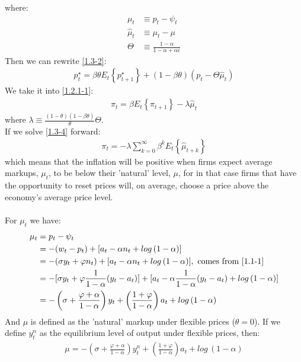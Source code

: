 \documentclass{article}
\numberwithin{equation}{section}
\begin{document}
where:
	\begin{align*}
		\mu_t &\equiv p_t - \psi_t\\
		\hat{\mu}_t &\equiv \mu_t - \mu\\
		\Theta &\equiv \frac{1 - \alpha}{1 - \alpha + \alpha\epsilon}
	\end{align*}
Then we can rewrite \eqref{1.3-2}:
	\begin{align}
		p^\star_t = \beta\theta E_t \left\{ p^\star_{t+1} \right\} + (1 - \beta\theta)(p_t - \Theta \hat{\mu}_t) \label{1.3-3}
	\end{align}
We take it into \eqref{1.2.1-1}:
	\begin{align}
		\pi_t = \beta E_t \left\{ \pi_{t+1} \right\} - \lambda \hat{\mu}_t \label{1.3-4}
	\end{align}
where $\lambda \equiv \frac{(1 - \theta)(1 - \beta\theta)}{\theta} \Theta$.\\
If we solve \eqref{1.3-4} forward:
	\begin{align*}
		\pi_t = -\lambda \sum\limits^\infty_{k=0} \beta^k E_t \left\{ \hat{\mu}_{t+k} \right\}
	\end{align*}
which means that the inflation will be positive when firms expect average markups, $\mu_t$, to be below their 'natural' level, $\mu$, for in that case firms that have the opportunity to reset prices will, on average, choose a price above the economy's average price level.\\\\
For $\mu_t$ we have:
	\begin{align}
		\mu_t &= p_t - \psi_t \nonumber\\
		&= -(w_t - p_t) + [a_t - \alpha n_t + log\,(1 - \alpha)] \nonumber\\
		&= -(\sigma y_t + \varphi n_t) + [a_t - \alpha n_t + log\,(1 - \alpha)],\ \text{comes from \eqref{1.1-1}} \nonumber\\
		&= -[\sigma y_t + \varphi \frac{1}{1 - \alpha}(y_t - a_t)] + [a_t - \alpha \frac{1}{1 - \alpha}(y_t - a_t) + log\,(1 - \alpha)] \nonumber\\
		&= -\left(\sigma + \frac{\varphi + \alpha}{1 - \alpha}\right)y_t + \left( \frac{1 + \varphi}{1 - \alpha}\right)a_t + log\,(1 - \alpha) \label{1.3-5}
	\end{align}
And $\mu$ is defined as the 'natural' markup under flexible prices ($\theta=0$). If we define $y^n_t$ as the equilibrium level of output under flexible prices, then:
	\begin{align}
		\mu = -\left(\sigma + \frac{\varphi + \alpha}{1 - \alpha}\right)y^n_t + \left( \frac{1 + \varphi}{1 - \alpha}\right)a_t + log\,(1 - \alpha) \label{1.3-6}
	\end{align}
\end{document}
